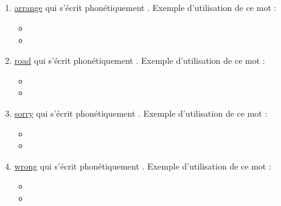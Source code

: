 \subsection{}\label{sec:r}

\begin{enumerate}
\item \href{http://www.wordreference.com/enfr/arrange}{arrange} qui s'écrit phonétiquement \href{https://en.oxforddictionaries.com/definition/arrange}{}. Exemple
d'utilisation de ce mot :

\begin{itemize}
\item{}
\item{}
\end{itemize}

\item \href{http://www.wordreference.com/enfr/road}{road} qui s'écrit phonétiquement \href{https://en.oxforddictionaries.com/definition/road}{}. Exemple d'utilisation de ce
mot :

\begin{itemize}
\item{}
\item{}
\end{itemize}
  
\item \href{http://www.wordreference.com/enfr/sorry}{sorry} qui s'écrit phonétiquement \href{https://en.oxforddictionaries.com/definition/sorry}{}. Exemple d'utilisation de
ce mot :

\begin{itemize}
\item{}
\item{}
\end{itemize}
  
\item \href{http://www.wordreference.com/enfr/wrong}{wrong} qui s'écrit phonétiquement \href{https://en.oxforddictionaries.com/definition/wrong}{}. Exemple d'utilisation de ce
mot :

\begin{itemize}
\item{}
\item{}
\end{itemize}

\end{enumerate}


